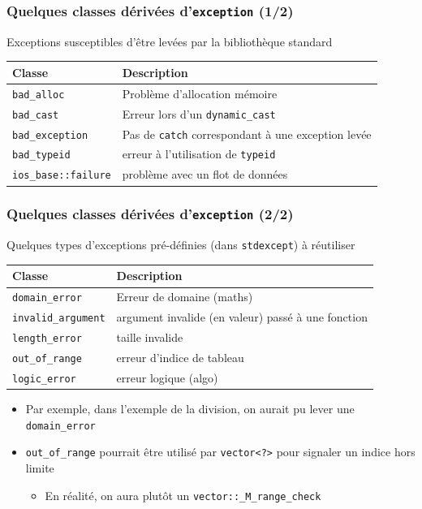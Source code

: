 \begin{frame}[fragile]\frametitle{Quelques classes dérivées d'\texttt{exception} (1/2)}
Exceptions susceptibles d'être levées par la bibliothèque standard
\begin{tabular}{|l|l|}
\hline Classe & Description \\ 
\hline \verb|bad_alloc| & Problème d'allocation mémoire \\ 
\hline \verb|bad_cast| & Erreur lors d'un \verb|dynamic_cast| \\
\hline \verb|bad_exception| & Pas de \verb|catch| correspondant à une exception levée \\
\hline \verb|bad_typeid| & erreur à l'utilisation de \verb|typeid| \\
\hline \verb|ios_base::failure| & problème avec un flot de données \\
\hline
\end{tabular} 
\end{frame}

\begin{frame}[fragile]\frametitle{Quelques classes dérivées d'\texttt{exception} (2/2)}
Quelques types d'exceptions pré-définies (dans \verb|stdexcept|) à réutiliser
\begin{tabular}{|l|l|}
\hline Classe & Description \\ 
\hline \verb|domain_error| & Erreur de domaine (maths) \\
\hline \verb|invalid_argument| & argument invalide (en valeur) passé à une fonction \\
\hline \verb|length_error| & taille invalide \\
\hline \verb|out_of_range| & erreur d'indice de tableau \\
\hline \verb|logic_error| & erreur logique (algo) \\
\hline
\end{tabular}
\begin{itemize}
\item Par exemple, dans l'exemple de la division, on aurait pu lever une \verb|domain_error|
\item \verb|out_of_range| pourrait être utilisé par \verb|vector<?>| pour signaler un indice hors limite
\begin{itemize}
\item En réalité, on aura plutôt un \verb|vector::_M_range_check|
\end{itemize} 
\end{itemize} 
\end{frame}